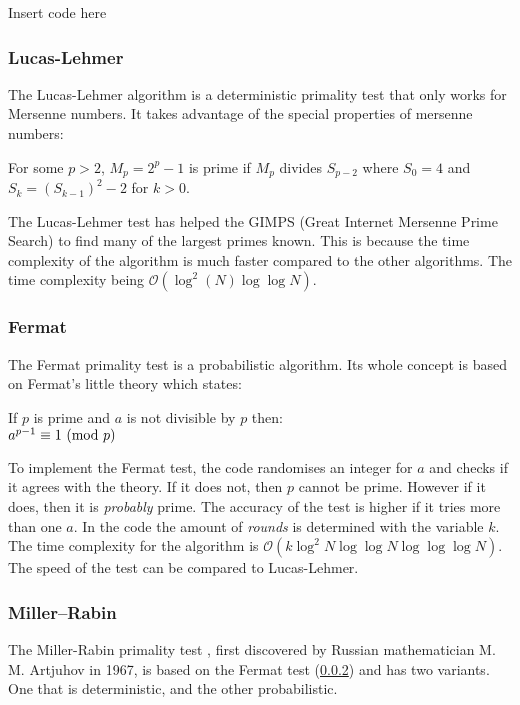 \documentclass[main.tex]{subfiles}
\begin{document}
\begin{python}
  Insert code here
\end{python}

\subsubsection{Lucas-Lehmer}
The Lucas-Lehmer algorithm \cite{algh:lucas} is a deterministic primality test
that only works for Mersenne numbers. It takes advantage of the special
properties of mersenne numbers: \newline

\begin{mdframed}
  For some $p>2$, $M_p=2^p-1$ is prime if $M_p$ divides $S_{p-2}$ where $S_0=4$ and
  $S_k=(S_{k-1})^2-2$ for $k>0$.
\end{mdframed}

The Lucas-Lehmer test has helped the GIMPS (Great Internet Mersenne Prime
Search) \cite{GIMPS} to find many of the largest primes known. This is because the
time complexity of the algorithm is much faster compared to the other
algorithms. The time complexity being $\mathcal{O}(\log^{2}(N) \log \log N)$.

\subsubsection{Fermat} \label{fermat} The Fermat primality test
\cite{algh:fermat} is a probabilistic algorithm. Its whole concept is based on
Fermat's little theory \cite{fermat:little} which states:

\begin{mdframed}
  \begin{center}
    If $p$ is prime and $a$ is not divisible by $p$ then: \\
    $a^{p - 1} \equiv 1 \ (\mathrm{mod}\ p)$
  \end{center}
\end{mdframed}

To implement the Fermat test, the code randomises an integer for $a$ and checks
if it agrees with the theory. If it does not, then $p$ cannot be prime. However
if it does, then it is \emph{probably} prime. The accuracy of the test is higher
if it tries more than one $a$. In the code the amount of \emph{rounds} is
determined with the variable $k$. The time complexity for the algorithm is
$\mathcal{O}(k \log^{2}N \log \log N \log \log \log N)$. The speed of the test
can be compared to Lucas-Lehmer.

\subsubsection{Miller–Rabin} The Miller-Rabin primality test \cite{algh:miller},
first discovered by Russian mathematician M. M. Artjuhov in 1967, is based on
the Fermat test (\ref{fermat}) and has two variants. One that is deterministic, and the other probabilistic. \\
\end{document}

